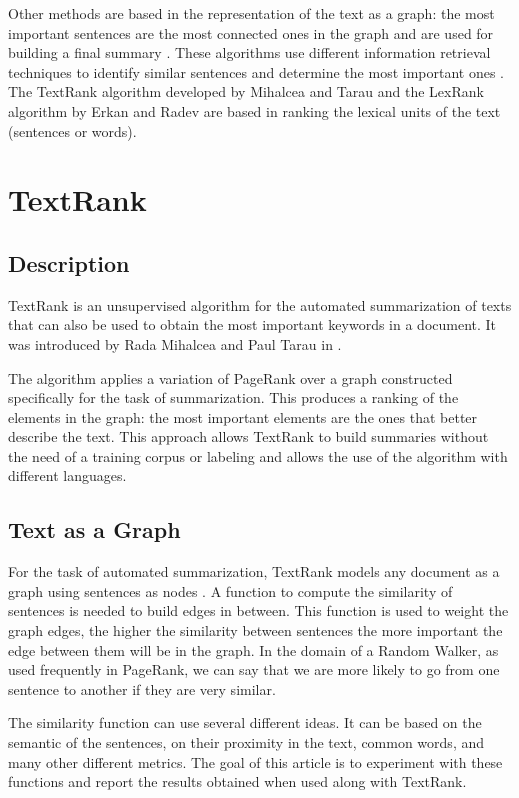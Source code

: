 \documentclass{llncs}
\begin{document}
Other methods are based in the representation of the text as a graph: the most important sentences are the most connected ones in the graph and are used for building a final summary \cite{barzilay}. These algorithms use different information retrieval techniques to identify similar sentences and determine the most important ones \cite{salton}. The TextRank algorithm developed by Mihalcea and Tarau \cite{mihalcea-tarau} and the LexRank algorithm by Erkan and Radev \cite{erkan} are based in ranking the lexical units of the text (sentences or words).

\section{TextRank}

\subsection{Description}
TextRank is an unsupervised algorithm for the automated summarization of texts that can also be used to obtain the most important keywords in a document. It was introduced by Rada Mihalcea and Paul Tarau in \cite{mihalcea-tarau}.

The algorithm applies a variation of PageRank \cite{pageetal98} over a graph constructed specifically for the task of summarization. This produces a ranking of the elements in the graph: the most important elements are the ones that better describe the text. This approach allows TextRank to build summaries without the need of a training corpus or labeling and allows the use of the algorithm with different languages.

\subsection{Text as a Graph}
For the task of automated summarization, TextRank models any document as a graph using sentences as nodes \cite{introductionir}. A function to compute the similarity of sentences is needed to build edges in between. This function is used to weight the graph edges, the higher the similarity between sentences the more important the edge between them will be in the graph. In the domain of a Random Walker, as used frequently in PageRank, we can say that we are more likely to go from one sentence to another if they are very similar. 

The similarity function can use several different ideas. It can be based on the semantic of the sentences, on their proximity in the text, common words, and many other different metrics. The goal of this article is to experiment with these functions and report the results obtained when used along with TextRank.
\end{document}
